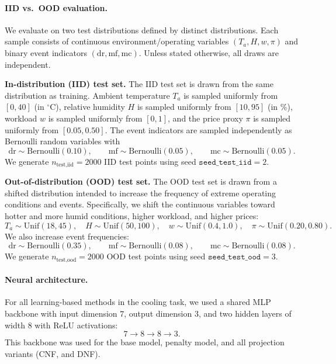 \documentclass{article}
\theoremstyle{plain}
\theoremstyle{definition}
\theoremstyle{remark}
\begin{document}
\paragraph{IID vs.\ OOD evaluation.}
We evaluate on two test distributions defined by distinct distributions.
Each sample consists of continuous environment/operating variables $(T_a, H, w, \pi)$ and binary event indicators $(\mathrm{dr},\mathrm{mf},\mathrm{mc})$.
Unless stated otherwise, all draws are independent.

\smallskip
\noindent\textbf{In-distribution (IID) test set.}
The IID test set is drawn from the same distribution as training.
Ambient temperature $T_a$ is sampled uniformly from $[0,40]$ (in ${}^\circ$C), relative humidity $H$ is sampled uniformly from $[10,95]$ (in \%), workload $w$ is sampled uniformly from $[0,1]$, and the price proxy $\pi$ is sampled uniformly from $[0.05,0.50]$.
The event indicators are sampled independently as Bernoulli random variables with
\[
\mathrm{dr}\sim \mathrm{Bernoulli}(0.10),\qquad
\mathrm{mf}\sim \mathrm{Bernoulli}(0.05),\qquad
\mathrm{mc}\sim \mathrm{Bernoulli}(0.05).
\]
We generate $n_{\text{test,iid}}=2000$ IID test points using seed $\texttt{seed\_test\_iid}=2$.

\smallskip
\noindent\textbf{Out-of-distribution (OOD) test set.}
The OOD test set is drawn from a shifted distribution intended to increase the frequency of extreme operating conditions and events.
Specifically, we shift the continuous variables toward hotter and more humid conditions, higher workload, and higher prices:
\[
T_a \sim \mathrm{Unif}(18,45),\quad
H   \sim \mathrm{Unif}(50,100),\quad
w   \sim \mathrm{Unif}(0.4,1.0),\quad
\pi  \sim \mathrm{Unif}(0.20,0.80).
\]
We also increase event frequencies:
\[
\mathrm{dr}\sim \mathrm{Bernoulli}(0.35),\qquad
\mathrm{mf}\sim \mathrm{Bernoulli}(0.08),\qquad
\mathrm{mc}\sim \mathrm{Bernoulli}(0.08).
\]
We generate $n_{\text{test,ood}}=2000$ OOD test points using seed $\texttt{seed\_test\_ood}=3$.

\smallskip




\paragraph{Neural architecture.}
For all learning-based methods in the cooling task, we used a shared MLP backbone with input dimension $7$, output dimension $3$, and two hidden layers of width $8$ with ReLU activations:
\[
7 \rightarrow 8 \rightarrow 8 \rightarrow 3.
\]
This backbone was used for the base model, penalty model, and all projection variants (CNF, and DNF).
\end{document}

